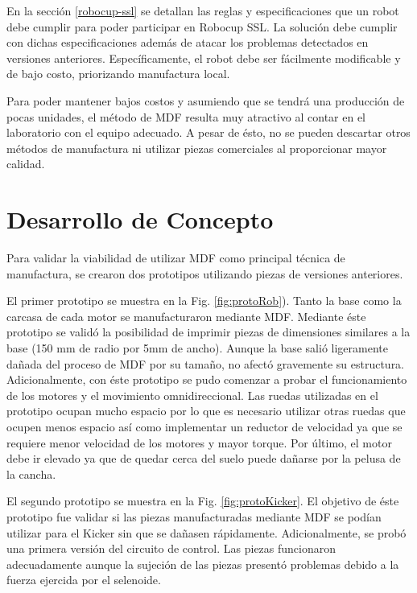 \begin{itemize}
\end{itemize}


En la sección \ref{robocup-ssl} se detallan las reglas y especificaciones que un robot debe cumplir para poder participar en Robocup \gls{SSL}. La solución debe cumplir con dichas especificaciones además de atacar los problemas detectados en versiones anteriores. Específicamente, el robot debe ser fácilmente modificable y de bajo costo, priorizando manufactura local.

Para poder mantener bajos costos y asumiendo que se tendrá una producción de pocas unidades, el método de \gls{MDF} resulta muy atractivo al contar en el laboratorio con el equipo adecuado. A pesar de ésto, no se pueden descartar otros métodos de manufactura ni utilizar piezas comerciales al proporcionar mayor calidad.


\section{Desarrollo de Concepto}
Para validar la viabilidad de utilizar \gls{MDF} como principal técnica de manufactura, se crearon dos prototipos utilizando piezas de versiones anteriores.

El primer prototipo se muestra en la Fig. \ref{fig:protoRob}). Tanto la base como la carcasa de cada motor se manufacturaron mediante \gls{MDF}. Mediante éste prototipo se validó la posibilidad de imprimir piezas de dimensiones similares a la base (150 mm de radio por 5mm de ancho). Aunque la base salió ligeramente dañada del proceso de \gls{MDF} por su tamaño, no afectó gravemente su estructura. Adicionalmente, con éste prototipo se pudo comenzar a probar el funcionamiento de los motores y el movimiento omnidireccional. Las ruedas utilizadas en el prototipo ocupan mucho espacio por lo que es necesario utilizar otras ruedas que ocupen menos espacio así como implementar un reductor de velocidad ya que se requiere menor velocidad de los motores y mayor torque. Por último, el motor debe ir elevado ya que de quedar cerca del suelo puede dañarse por la pelusa de la cancha.

El segundo prototipo se muestra en la Fig. \ref{fig:protoKicker}. El objetivo de éste prototipo fue validar si las piezas manufacturadas mediante \gls{MDF} se podían utilizar para el \gls{Kicker} sin que se dañasen rápidamente. Adicionalmente, se probó una primera versión del circuito de control. Las piezas funcionaron adecuadamente aunque la sujeción de las piezas presentó problemas debido a la fuerza ejercida por el selenoide.


